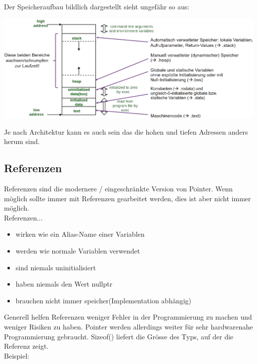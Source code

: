 Der Speicheraufbau bildlich dargestellt sieht ungefähr so aus:

\begin{center}
    \includegraphics[width=\columnwidth]{pictures/memorylayout.png}  
\end{center}

Je nach Architektur kann es auch sein das die hohen und tiefen Adressen anders herum sind.

\subsection{Referenzen}

Referenzen sind die modernere / eingeschränkte Version von Pointer. 
Wenn möglich sollte immer mit Referenzen gearbeitet werden, dies ist aber nicht immer möglich.\\

Referenzen...
\begin{itemize}[itemsep=1pt, parsep=0pt]
    \item wirken wie ein Alias-Name einer Variablen
    \item werden wie normale Variablen verwendet
    \item sind niemals uninitialisiert
    \item haben niemals den Wert nullptr
    \item brauchen nicht immer speicher(Implementation abhängig)
\end{itemize}

Generell helfen Referenzen weniger Fehler in der Programmierung zu machen und weniger Risiken zu haben. 
Pointer werden allerdings weiter für sehr hardwarenahe Programmierung gebraucht. 
Sizeof() liefert die Grösse des Typs, auf der die Referenz zeigt.\\
Beispiel:




